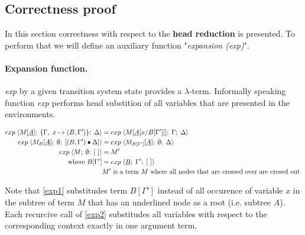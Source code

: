 \documentclass[a4paper, 10pt]{article}
\begin{document}
\subsection{Correctness proof}
In this section correctness with respect to the \textbf{head reduction} is presented.
To perform that we will define an auxiliary function "\emph{expansion (exp)}".

\paragraph{Expansion function.} 
\emph{exp} by a given transition system state provides a $\lambda$-term.
Informally speaking function \emph{exp} performs head substition of all
variables that are presented in the environments.

\begin{align}
  \label{exp1} exp\; \langle M[\underline{A}];\; \{\Gamma,\ x \mapsto (B, \Gamma')\};\; \Delta \rangle
  &= exp\; \langle M[\underline{A}[x / B[\Gamma']]];\; \Gamma;\; \Delta \rangle \\
  \label{exp2} exp\; \langle M_B[\underline{A}];\; \emptyset;\; [(B,\Gamma')\bullet\Delta] \rangle
  &= exp\; \langle M_{B[\Gamma']}[\underline{A}];\; \emptyset;\; \Delta \rangle\\
  \label{exp3} exp\; \langle M;\; \emptyset;\; [\ ] \rangle &= M' \\
  \textnormal{where } B[\Gamma'] &= exp\; \langle \underline{B};\; \Gamma';\; [\ ] \rangle \\
  & M' \textnormal{ is a term } M \textnormal{ where all nodes that are crossed over are crosed out }
\end{align}

Note that \eqref{exp1} substitudes term $B[\Gamma']$ instead of all occurence of variable $x$ in the subtree of term $M$ that has an underlined node as a root (i.e. subtree $A$). Each recurcive call of \eqref{exp2} substitudes all variables with respect to the corresponding context exactly in one argument term.
\end{document}
